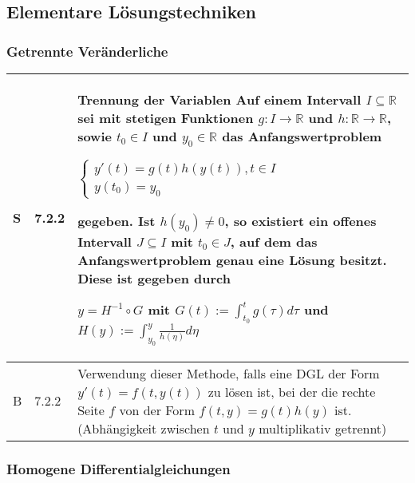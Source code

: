 \subsection{Elementare Lösungstechniken}
\subsubsection{Getrennte Veränderliche}

    \begin{longtable}{p{0.75cm} p{1cm} p{16cm}}
        \toprule

        S   & 7.2.2 &   \textbf{Trennung der Variablen} \hfill \break
                        Auf einem Intervall $I \subseteq \mathbb{R}$ sei mit stetigen Funktionen $g: I \rightarrow \mathbb{R}$ und 
                        $h: \mathbb{R} \rightarrow \mathbb{R}$, sowie $t_0 \in I$ und $y_0 \in \mathbb{R}$ das Anfangswertproblem \hfill \break
                        \centerline{$   \begin{cases}
                                            y'(t) = g(t) h(y(t)), t\in I \\
                                            y(t_0) = y_0
                                        \end{cases}$}
                        gegeben. Ist $h(y_0) \neq 0$, so existiert ein offenes Intervall $J \subseteq I$ mit $t_0 \in J$, auf dem
                        das Anfangswertproblem genau eine Lösung besitzt. Diese ist gegeben durch \hfill \break
                        \centerline{$ y = H^{-1} \circ G$ mit $G(t) := \int^t_{t_0} g(\tau) d\tau$ und $H(y) := \int^y_{y_0} \frac{1}{h(\eta)}d\eta  $} \\
        \midrule
        B   & 7.2.2 &   Verwendung dieser Methode, falls eine DGL der Form $y'(t) = f(t,y(t))$ zu lösen ist, bei der die rechte Seite $f$ von der
                        Form $f(t,y) = g(t)h(y)$ ist. (Abhängigkeit zwischen $t$ und $y$ multiplikativ getrennt) \\
        \bottomrule
    \end{longtable}

\subsubsection{Homogene Differentialgleichungen}

